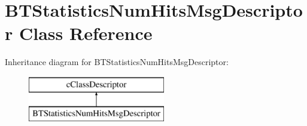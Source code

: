 \hypertarget{classBTStatisticsNumHitsMsgDescriptor}{}\section{B\+T\+Statistics\+Num\+Hits\+Msg\+Descriptor Class Reference}
\label{classBTStatisticsNumHitsMsgDescriptor}
Inheritance diagram for B\+T\+Statistics\+Num\+Hits\+Msg\+Descriptor\+:\begin{figure}[H]
\begin{center}
\leavevmode
\includegraphics[height=2.000000cm]{classBTStatisticsNumHitsMsgDescriptor}
\end{center}
\end{figure}
